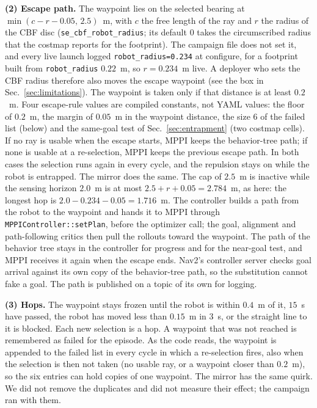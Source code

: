 \documentclass[journal]{IEEEtran}
\begin{document}
\textbf{(2) Escape path.} The waypoint lies on the selected bearing at
$\min(c-r-0.05,\,2.5)$~m, with $c$ the free length of the ray and $r$ the radius of the
CBF disc (\texttt{se\_cbf\_robot\_radius}; its default $0$ takes the circumscribed radius that
the costmap reports for the footprint). The campaign file does not set it, and every live
launch logged \texttt{robot\_radius=0.234} at configure, for a footprint built from
\texttt{robot\_radius} $0.22$~m, so $r=0.234$~m live. A deployer who sets the CBF radius
therefore also moves the escape waypoint (see the box in Sec.~\ref{sec:limitations}). The waypoint is taken only if that distance is at
least $0.2$~m. Four escape-rule values are compiled constants, not YAML values: the floor of $0.2$~m, the
margin of $0.05$~m in the waypoint distance, the size $6$ of the failed list (below) and the
same-goal test of Sec.~\ref{sec:entrapment} (two costmap cells).
If no ray is usable when the escape starts, MPPI keeps the behavior-tree path; if none is usable at
a re-selection, MPPI keeps the previous escape path. In both cases the selection runs again in every
cycle, and the repulsion stays on while the robot is entrapped. The mirror does the same. The cap of
$2.5$~m is inactive while the sensing horizon $2.0$~m is at most $2.5+r+0.05=2.784$~m, as
here: the longest hop is $2.0-0.234-0.05=1.716$~m. The controller builds a
path from the robot to the waypoint and hands it to MPPI through
\texttt{MPPIController::setPlan}, before the optimizer call; the goal, alignment and
path-following critics then pull the rollouts toward the waypoint. The path of the
behavior tree stays in the controller for progress and for the near-goal test,
and MPPI receives it again when the escape ends. Nav2's controller server checks goal
arrival against its own copy of the behavior-tree path, so the substitution cannot fake
a goal. The path is published on a topic of its own for logging.

\textbf{(3) Hops.} The waypoint stays frozen until the robot is within $0.4$~m of it,
$15$~s have passed, the robot has moved less than $0.15$~m in $3$~s, or the straight line
to it is blocked. Each new selection is a hop. A waypoint that was not reached is
remembered as failed for the episode. As the code reads, the waypoint is appended to the
failed list in every cycle in which a re-selection fires, also when the selection is then
not taken (no usable ray, or a waypoint closer than $0.2$~m), so the six entries can hold
copies of one waypoint. The mirror has the same quirk. We did not remove the duplicates
and did not measure their effect; the campaign ran with them.
\end{document}
